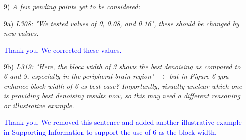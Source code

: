 \documentclass[a4paper,11pt,twoside]{report}
\begin{document}
\begin{enumerate}
    \item [9)] \textit{A few pending points yet to be considered:}

    \item [9a)] \textit{L308: "We tested values of 0, 0.08, and 0.16", these should be changed by new values.}

    \hspace{1em} \textcolor{blue}{Thank you. We corrected these values.}

    \item [9b)] \textit{L319: "Here, the block width of 3 shows the best denoising as compared to 6 and 9, especially in the peripheral brain region" $\rightarrow$ but in Figure 6 you enhance block width of 6 as best case? Importantly, visually unclear which one is providing best denoising results now, so this may need a different reasoning or illustrative example.}

    \hspace{1em} \textcolor{blue}{Thank you. We removed this sentence and
    added another illustrative example in Supporting Information
    to support the use of 6 as the block width.}

\end{enumerate}
\end{document}
